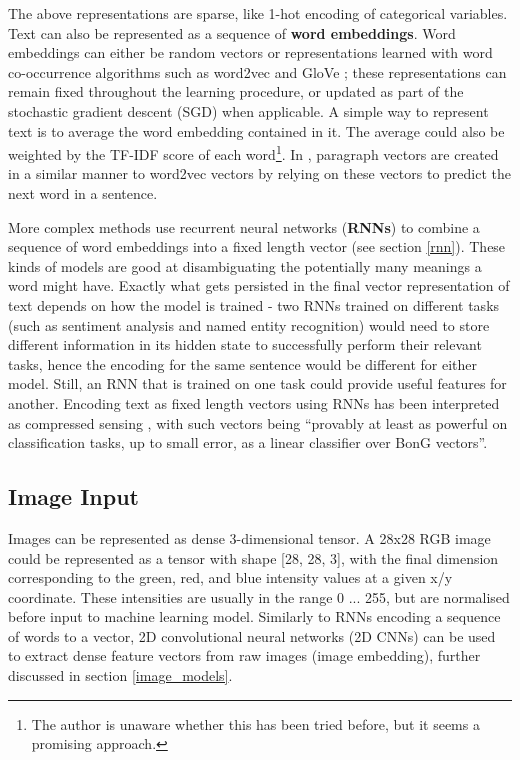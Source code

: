 The above representations are sparse, like 1-hot encoding of categorical variables.
Text can also be  represented as a sequence of \textbf{word embeddings}.
Word embeddings can either be random vectors or representations  learned with word co-occurrence algorithms such as word2vec \cite{word2vec} and GloVe \cite{glove};  these representations can remain fixed throughout the learning procedure, or updated as part of the stochastic gradient descent (SGD) when applicable.
A simple way to represent text is to average the word embedding contained in it.
The  average could also be weighted by the TF-IDF score of each word\footnote{The author is unaware whether this has been tried before, but it seems a promising approach.}.
In \cite{doc2vec}, paragraph vectors are created in a similar manner to word2vec vectors by relying on these vectors to predict the next word in a sentence.

More complex methods use recurrent neural networks (\textbf{RNNs}) to combine a sequence of word embeddings  into a fixed length vector (see section \ref{rnn}).
These kinds of models are good at  disambiguating the potentially many meanings a word might have.
Exactly what gets persisted in the final  vector representation of text depends on how the model is trained - two RNNs  trained on different tasks (such as sentiment analysis and named entity recognition)  would need to store different information in its hidden state to successfully  perform their relevant tasks,  hence the encoding for the same sentence would be different for either model.
Still, an RNN  that is trained on one task could provide useful features for another.
Encoding text as fixed length vectors using RNNs has been interpreted as compressed sensing \cite{compressed_sensing_rnn}, with such vectors being ``provably at least as powerful on classification tasks, up to small error, as a linear classifier over BonG vectors''.

\subsection{Image Input}

Images can be represented as dense 3-dimensional tensor.
A 28x28 RGB image could be represented as a tensor with shape [28, 28, 3],  with the final dimension corresponding to the green, red, and blue intensity values at a given x/y coordinate.
These intensities  are usually in the range 0 ... 255, but are normalised before input to machine learning model.
Similarly to RNNs  encoding a sequence of words to a vector, 2D convolutional neural networks (2D CNNs)  can be used to extract dense feature vectors from raw images (image embedding),  further discussed in section \ref{image_models}.

